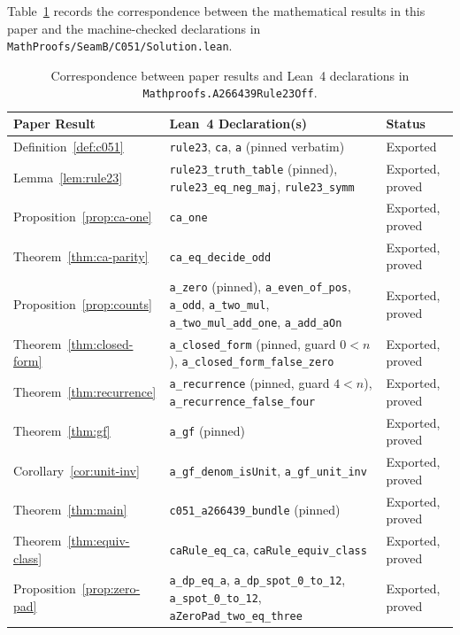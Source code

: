 \documentclass[11pt]{article}
\theoremstyle{definition}
\begin{document}
Table~\ref{tab:lean-map} records the correspondence between the mathematical results in this paper and the machine-checked declarations in \nolinkurl{MathProofs/SeamB/C051/Solution.lean}.

\begin{table}[ht]
\centering
\caption{Correspondence between paper results and Lean~4 declarations in \nolinkurl{Mathproofs.A266439Rule23Off}.}
\label{tab:lean-map}
\smallskip
{\small
\begin{tabular}{@{}l >{\raggedright\arraybackslash}p{8.2cm} l@{}}
\toprule
Paper Result & Lean~4 Declaration(s) & Status \\
\midrule
Definition~\ref{def:c051} & \texttt{rule23}, \texttt{ca}, \texttt{a} (pinned verbatim) & Exported \\
Lemma~\ref{lem:rule23} & \texttt{rule23\_truth\_table} (pinned), \texttt{rule23\_eq\_neg\_maj}, \texttt{rule23\_symm} & Exported, proved \\
Proposition~\ref{prop:ca-one} & \texttt{ca\_one} & Exported, proved \\
Theorem~\ref{thm:ca-parity} & \texttt{ca\_eq\_decide\_odd} & Exported, proved \\
Proposition~\ref{prop:counts} & \texttt{a\_zero} (pinned), \texttt{a\_even\_of\_pos}, \texttt{a\_odd}, \texttt{a\_two\_mul}, \texttt{a\_two\_mul\_add\_one}, \texttt{a\_add\_aOn} & Exported, proved \\
Theorem~\ref{thm:closed-form} & \texttt{a\_closed\_form} (pinned, guard $0 < n$), \texttt{a\_closed\_form\_false\_zero} & Exported, proved \\
Theorem~\ref{thm:recurrence} & \texttt{a\_recurrence} (pinned, guard $4 < n$), \texttt{a\_recurrence\_false\_four} & Exported, proved \\
Theorem~\ref{thm:gf} & \texttt{a\_gf} (pinned) & Exported, proved \\
Corollary~\ref{cor:unit-inv} & \texttt{a\_gf\_denom\_isUnit}, \texttt{a\_gf\_unit\_inv} & Exported, proved \\
Theorem~\ref{thm:main} & \texttt{c051\_a266439\_bundle} (pinned) & Exported, proved \\
Theorem~\ref{thm:equiv-class} & \texttt{caRule\_eq\_ca}, \texttt{caRule\_equiv\_class} & Exported, proved \\
Proposition~\ref{prop:zero-pad} & \texttt{a\_dp\_eq\_a}, \texttt{a\_dp\_spot\_0\_to\_12}, \texttt{a\_spot\_0\_to\_12}, \texttt{aZeroPad\_two\_eq\_three} & Exported, proved \\
\bottomrule
\end{tabular}
}
\end{table}
\end{document}
